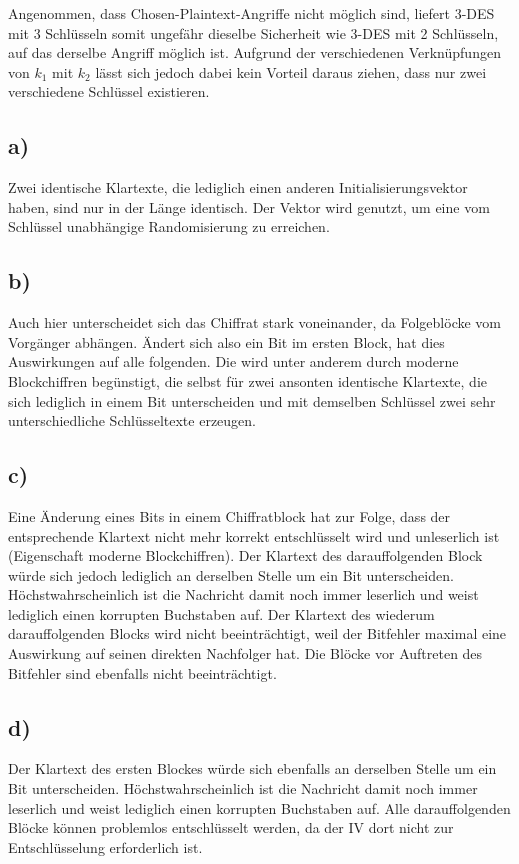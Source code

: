 \documentclass[ngerman]{fbi-aufgabenblatt}
\begin{document}
	Angenommen, dass Chosen-Plaintext-Angriffe nicht möglich sind, liefert 3-DES mit 3 Schlüsseln somit ungefähr dieselbe Sicherheit wie 3-DES mit 2 Schlüsseln, auf das derselbe Angriff möglich ist. Aufgrund der verschiedenen Verknüpfungen von $k_1$ mit $k_2$ lässt sich jedoch dabei kein Vorteil daraus ziehen, dass nur zwei verschiedene Schlüssel existieren.
		
    \setcounter{section}{2}
    
	
	\subsection*{a)}
	Zwei identische Klartexte, die lediglich einen anderen Initialisierungsvektor haben, sind nur in der Länge identisch.
	Der Vektor wird genutzt, um eine vom Schlüssel unabhängige Randomisierung zu erreichen.
	
	\subsection*{b)}
	Auch hier unterscheidet sich das Chiffrat stark voneinander, da Folgeblöcke vom Vorgänger abhängen. Ändert sich also ein Bit im ersten Block, hat dies Auswirkungen auf alle folgenden. Die wird unter anderem durch moderne Blockchiffren begünstigt, die selbst für zwei ansonten identische Klartexte, die sich lediglich in einem Bit unterscheiden und mit demselben Schlüssel zwei sehr unterschiedliche Schlüsseltexte erzeugen.
	
	\subsection*{c)}
	Eine Änderung eines Bits in einem Chiffratblock hat zur Folge, dass der entsprechende Klartext nicht mehr korrekt entschlüsselt wird und unleserlich ist (Eigenschaft moderne Blockchiffren). Der Klartext des darauffolgenden Block würde sich jedoch lediglich an derselben Stelle um ein Bit unterscheiden. Höchstwahrscheinlich ist die Nachricht damit noch immer leserlich und weist lediglich einen korrupten Buchstaben auf. Der Klartext des wiederum darauffolgenden Blocks wird nicht beeinträchtigt, weil der Bitfehler maximal eine Auswirkung auf seinen direkten Nachfolger hat. Die Blöcke vor Auftreten des Bitfehler sind ebenfalls nicht beeinträchtigt.

	\subsection*{d)}
	Der Klartext des ersten Blockes würde sich ebenfalls an derselben Stelle um ein Bit unterscheiden. Höchstwahrscheinlich ist die Nachricht damit noch immer leserlich und weist lediglich einen korrupten Buchstaben auf. Alle darauffolgenden Blöcke können problemlos entschlüsselt werden, da der IV dort nicht zur Entschlüsselung erforderlich ist.
	
\end{document}
